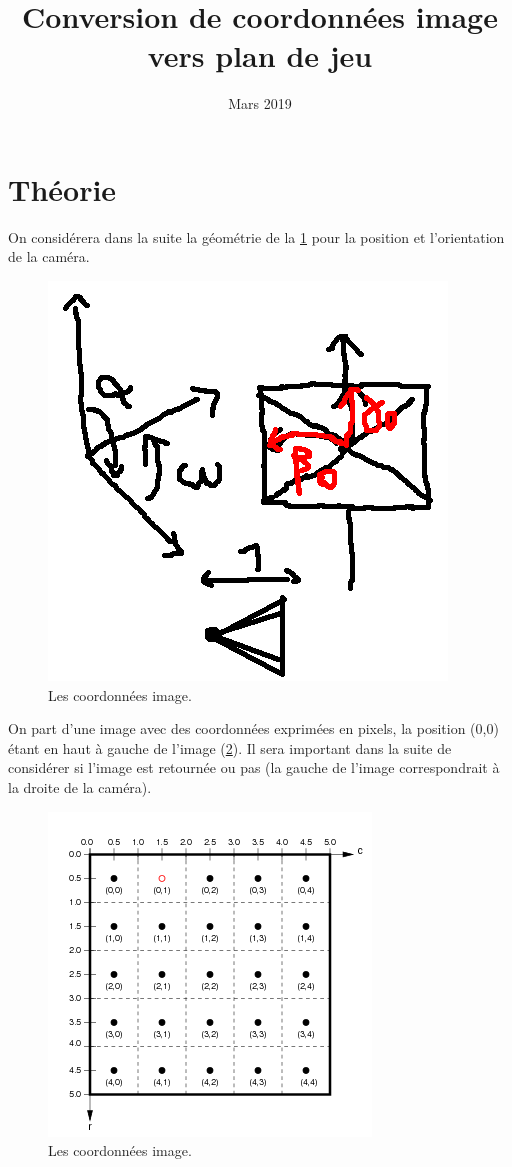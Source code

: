 \documentclass{article}
\title{Conversion de coordonnées image vers plan de jeu}
\date{Mars 2019}
\begin{document}
\maketitle

\section{Théorie}

On considérera dans la suite la géométrie de la \ref{fig1} pour la position et l'orientation de la caméra.

\begin{figure}[h!]
\centering
\includegraphics[scale=0.5]{camera.png}
\caption{Les coordonnées image.}
\label{fig1}
\end{figure}

On part d'une image avec des coordonnées exprimées en pixels, la position (0,0) étant en haut à gauche de l'image (\ref{fig2}). Il sera important dans la suite de considérer si l'image est retournée ou pas (la gauche de l'image correspondrait à la droite de la caméra).

\begin{figure}[h!]
\centering
\includegraphics[scale=0.5]{image.png}
\caption{Les coordonnées image.}
\label{fig2}
\end{figure}
\end{document}
